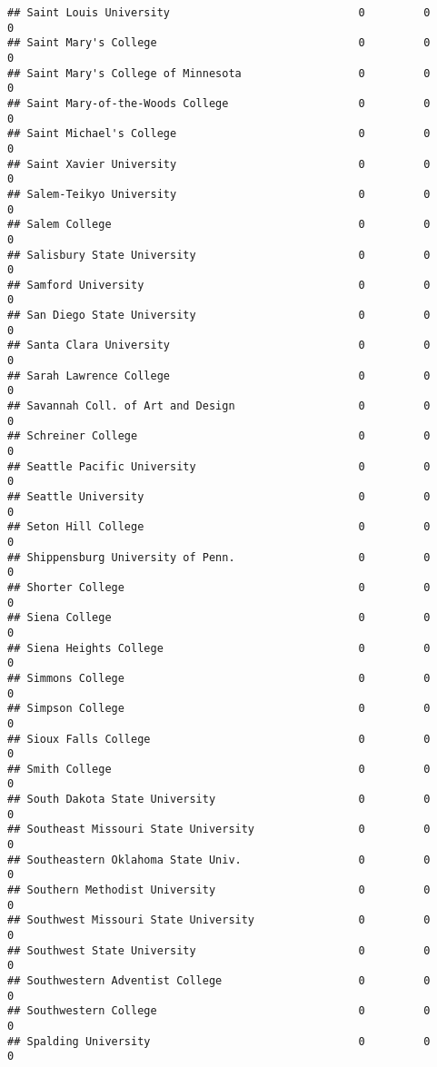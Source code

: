 \documentclass[
]{article}
\begin{document}
\begin{verbatim}
## Saint Louis University                             0         0         0
## Saint Mary's College                               0         0         0
## Saint Mary's College of Minnesota                  0         0         0
## Saint Mary-of-the-Woods College                    0         0         0
## Saint Michael's College                            0         0         0
## Saint Xavier University                            0         0         0
## Salem-Teikyo University                            0         0         0
## Salem College                                      0         0         0
## Salisbury State University                         0         0         0
## Samford University                                 0         0         0
## San Diego State University                         0         0         0
## Santa Clara University                             0         0         0
## Sarah Lawrence College                             0         0         0
## Savannah Coll. of Art and Design                   0         0         0
## Schreiner College                                  0         0         0
## Seattle Pacific University                         0         0         0
## Seattle University                                 0         0         0
## Seton Hill College                                 0         0         0
## Shippensburg University of Penn.                   0         0         0
## Shorter College                                    0         0         0
## Siena College                                      0         0         0
## Siena Heights College                              0         0         0
## Simmons College                                    0         0         0
## Simpson College                                    0         0         0
## Sioux Falls College                                0         0         0
## Smith College                                      0         0         0
## South Dakota State University                      0         0         0
## Southeast Missouri State University                0         0         0
## Southeastern Oklahoma State Univ.                  0         0         0
## Southern Methodist University                      0         0         0
## Southwest Missouri State University                0         0         0
## Southwest State University                         0         0         0
## Southwestern Adventist College                     0         0         0
## Southwestern College                               0         0         0
## Spalding University                                0         0         0

\end{verbatim}
\end{document}
